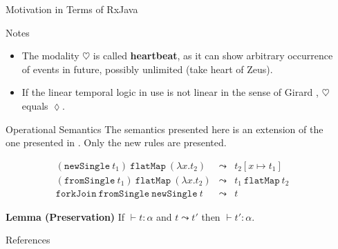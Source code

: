\documentclass[final]{beamer}
\newlength{\sepwidth}
\newlength{\colwidth}
\newcommand{\separatorcolumn}{\begin{column}{\sepwidth}\end{column}}
\begin{document}
\begin{frame}[t]
\begin{columns}[t]
\begin{column}{\colwidth}
\begin{block}{Motivation in Terms of RxJava}
  \end{block}
  
  \begin{alertblock}{Notes}
  \begin{itemize}
      \item The modality $\heartsuit$ is called \textbf{heartbeat}, as it can show arbitrary occurrence of events in future, possibly unlimited (take heart of Zeus).
      
      \item If the linear temporal logic in use is not linear in the sense of Girard \cite{DBLP:journals/tcs/Girard87}, $\heartsuit$ equals $\lozenge$.
  \end{itemize}
  \end{alertblock}
  
  \begin{block}{Operational Semantics}
  The semantics presented here is an extension of the one presented in \cite{aerabi-MSc}. Only the new rules are presented.
  
  
  \begin{eqnarray*}
  (\mathtt{newSingle}~t_1)~\mathtt{flatMap}~(\lambda x. t_2) &\leadsto& t_2[x \mapsto t_1] \\
  (\mathtt{fromSingle}~t_1)~\mathtt{flatMap}~(\lambda x. t_2) &\leadsto& t_1~\mathtt{flatMap}~t_2 \\
  \mathtt{forkJoin~fromSingle~newSingle}~t &\leadsto& t
  \end{eqnarray*}
  \end{block}
  
  \textbf{Lemma (Preservation)} If $\vdash t : \alpha$ and $t \leadsto t'$ then $\vdash t' : \alpha$.

  \begin{block}{References}

    \nocite{*}
    \footnotesize{}

  \end{block}

\end{column}

\separatorcolumn
\end{columns}
\end{frame}
\end{document}

